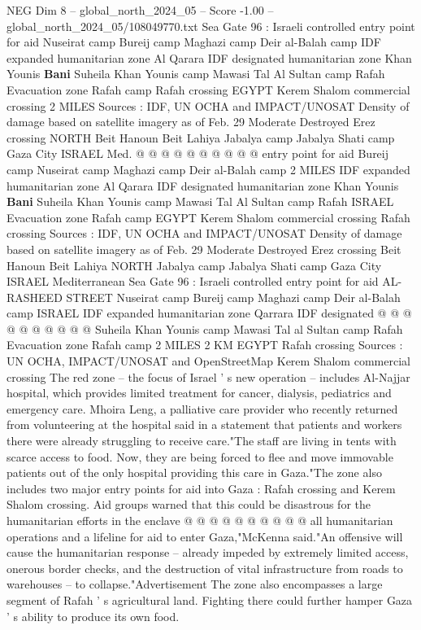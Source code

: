 \begin{textsample}{NEG Dim 8 – global\_north\_2024\_05 – Score -1.00 – global\_north\_2024\_05/108049770.txt}
Sea Gate 96 : Israeli controlled entry point for aid Nuseirat camp Bureij camp Maghazi camp Deir al-Balah camp IDF expanded humanitarian zone Al Qarara IDF designated humanitarian zone Khan Younis \textbf{Bani} Suheila Khan Younis camp Mawasi Tal Al Sultan camp Rafah Evacuation zone Rafah camp Rafah crossing EGYPT Kerem Shalom commercial crossing 2 MILES Sources : IDF, UN OCHA and IMPACT/UNOSAT Density of damage based on satellite imagery as of Feb. 29 Moderate Destroyed Erez crossing NORTH Beit Hanoun Beit Lahiya Jabalya camp Jabalya Shati camp Gaza City ISRAEL Med. @ @ @ @ @ @ @ @ @ @ entry point for aid Bureij camp Nuseirat camp Maghazi camp Deir al-Balah camp 2 MILES IDF expanded humanitarian zone Al Qarara IDF designated humanitarian zone Khan Younis \textbf{Bani} Suheila Khan Younis camp Mawasi Tal Al Sultan camp Rafah ISRAEL Evacuation zone Rafah camp EGYPT Kerem Shalom commercial crossing Rafah crossing Sources : IDF, UN OCHA and IMPACT/UNOSAT Density of damage based on satellite imagery as of Feb. 29 Moderate Destroyed Erez crossing Beit Hanoun Beit Lahiya NORTH Jabalya camp Jabalya Shati camp Gaza City ISRAEL Mediterranean Sea Gate 96 : Israeli controlled entry point for aid AL-RASHEED STREET Nuseirat camp Bureij camp Maghazi camp Deir al-Balah camp ISRAEL IDF expanded humanitarian zone Qarrara IDF designated @ @ @ @ @ @ @ @ @ @ Suheila Khan Younis camp Mawasi Tal al Sultan camp Rafah Evacuation zone Rafah camp 2 MILES 2 KM EGYPT Rafah crossing Sources : UN OCHA, IMPACT/UNOSAT and OpenStreetMap Kerem Shalom commercial crossing The red zone -- the focus of Israel ' s new operation -- includes Al-Najjar hospital, which provides limited treatment for cancer, dialysis, pediatrics and emergency care.
Mhoira Leng, a palliative care provider who recently returned from volunteering at the hospital said in a statement that patients and workers there were already struggling to receive care."The staff are living in tents with scarce access to food.
Now, they are being forced to flee and move immovable patients out of the only hospital providing this care in Gaza."The zone also includes two major entry points for aid into Gaza : Rafah crossing and Kerem Shalom crossing.
Aid groups warned that this could be disastrous for the humanitarian efforts in the enclave @ @ @ @ @ @ @ @ @ @ all humanitarian operations and a lifeline for aid to enter Gaza,"McKenna said."An offensive will cause the humanitarian response -- already impeded by extremely limited access, onerous border checks, and the destruction of vital infrastructure from roads to warehouses -- to collapse."Advertisement The zone also encompasses a large segment of Rafah ' s agricultural land.
Fighting there could further hamper Gaza ' s ability to produce its own food.

\end{textsample}
